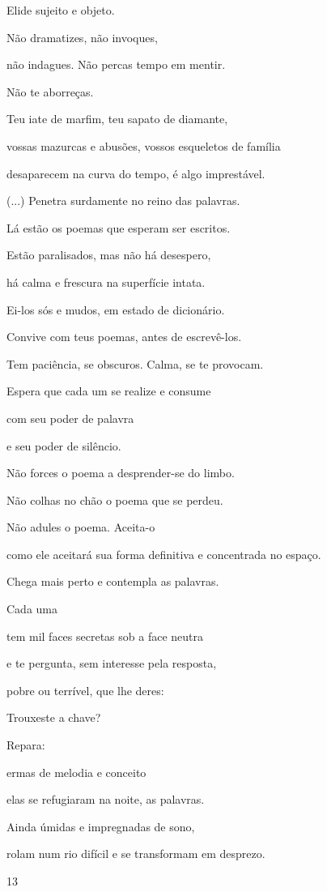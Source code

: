 Elide sujeito e objeto.

Não dramatizes, não invoques,

não indagues. Não percas tempo em mentir.

Não te aborreças.

Teu iate de marfim, teu sapato de diamante,

vossas mazurcas e abusões, vossos esqueletos de família

desaparecem na curva do tempo, é algo imprestável.

(...) Penetra surdamente no reino das palavras.

Lá estão os poemas que esperam ser escritos.

Estão paralisados, mas não há desespero,

há calma e frescura na superfície intata.

Ei-los sós e mudos, em estado de dicionário.

Convive com teus poemas, antes de escrevê-los.

Tem paciência, se obscuros. Calma, se te provocam.

Espera que cada um se realize e consume

com seu poder de palavra

e seu poder de silêncio.

Não forces o poema a desprender-se do limbo.

Não colhas no chão o poema que se perdeu.

Não adules o poema. Aceita-o

como ele aceitará sua forma definitiva e concentrada no espaço.

Chega mais perto e contempla as palavras.

Cada uma

tem mil faces secretas sob a face neutra

e te pergunta, sem interesse pela resposta,

pobre ou terrível, que lhe deres:

Trouxeste a chave?

Repara:

ermas de melodia e conceito

elas se refugiaram na noite, as palavras.

Ainda úmidas e impregnadas de sono,

rolam num rio difícil e se transformam em desprezo.

13

